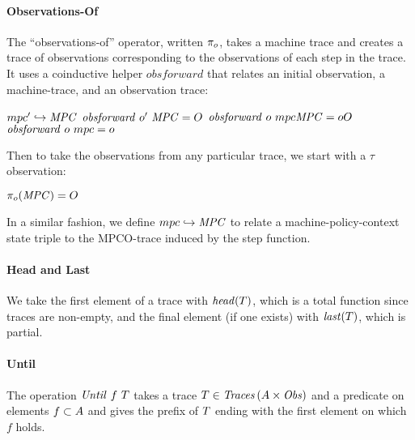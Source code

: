 \documentclass[acmsmall,review,anonymous]{acmart}\settopmatter{printfolios=true,printccs=false,printacmref=false}
\begin{document}
\paragraph*{Observations-Of}

The ``observations-of'' operator, written \(\pi_o\), takes a machine trace and
creates a trace of observations corresponding to the observations of each step in
the trace. It uses a coinductive helper \(\mathit{obsforward}\) that relates an
initial observation, a machine-trace, and an observation trace:

              {\(mpc' \hookrightarrow \mathit{MPC}\)}
              {\(\mathit{obsforward} ~ o' ~ \mathit{MPC} = O\)}
              {\(\mathit{obsforward} ~ o ~ mpc \mathit{MPC} = oO\)}%
\judgment{}
         {\(\mathit{obsforward} ~ o ~ mpc = o\)}

Then to take the observations from any particular trace, we start with a \(\tau\) observation:

         {\(\pi_o(\mathit{MPC}) = O\)}
\noindent

In a similar fashion, we define \(mpc \hookrightarrow \mathit{MPC}\)
to relate a machine-policy-context state triple to the MPCO-trace
induced by the step function.

\paragraph*{Head and Last}

We take the first element of a trace with \(\mathit{head}(T)\), which is a total
function since traces are non-empty, and the final element (if one exists) with
\(\mathit{last}(T)\), which is partial.

\paragraph*{Until}
The operation \(\mathit{Until} ~ f ~ T\) takes a trace
\(T \in \mathit{Traces}\,(A \times \mathit{Obs})\) and a predicate
on elements \(f \subset A\) and gives the prefix of
\(T\) ending with the first element on which \(f\) holds.
\end{document}
